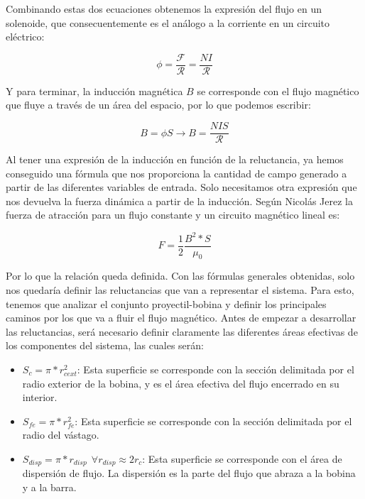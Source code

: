 Combinando estas dos ecuaciones obtenemos la expresión del flujo en un solenoide, que consecuentemente es el análogo a la corriente en un circuito eléctrico:

\begin{center}
    \[\phi=\frac{\mathcal{F}}{\mathcal{R}}=\frac{NI}{\mathcal{R}}\]
\end{center}

Y para terminar, la inducción magnética \(B\) se corresponde con el flujo magnético que fluye a través de un área del espacio, por lo que podemos escribir:

\begin{center}
    \[B=\phi S\to B=\frac{NIS}{\mathcal{R}}\]
\end{center}

Al tener una expresión de la inducción en función de la reluctancia, ya hemos conseguido una fórmula que nos proporciona la cantidad de campo generado a partir de las diferentes variables de entrada. Solo necesitamos otra expresión que nos devuelva la fuerza dinámica a partir de la inducción. Según Nicolás Jerez \citep{jerez2016resueltos} la fuerza de atracción para un flujo constante y un circuito magnético lineal es:

\begin{center}
\[F=\frac{1}{2}\frac{B^2*S}{\mu_0}\]
\end{center}

Por lo que la relación queda definida. Con las fórmulas generales obtenidas, solo nos quedaría definir las reluctancias que van a representar el sistema. Para esto, tenemos que analizar el conjunto proyectil-bobina y definir los principales caminos por los que va a fluir el flujo magnético. Antes de empezar a desarrollar las reluctancias, será necesario definir claramente las diferentes áreas efectivas de los componentes del sistema, las cuales serán:

\begin{itemize}
    \item \(S_{c}=\pi *r_{cext}^2\): Esta superficie se corresponde con la sección delimitada por el radio exterior de la bobina, y es el área efectiva del flujo encerrado en su interior.
    \item \(S_{fe}=\pi *r_{fe}^2\): Esta superficie se corresponde con la sección delimitada por el radio del vástago.
    \item \(S_{disp}=\pi *r_{disp}~~\forall r_{disp}\approx 2r_c\): Esta superficie se corresponde con el área de dispersión de flujo. La dispersión es la parte del flujo que abraza a la bobina y a la barra.
\end{itemize}

